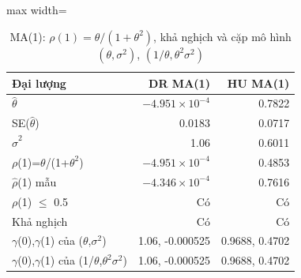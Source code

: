 \begin{table}[H]
\centering\small
\caption{MA(1): $\rho(1)=\theta/(1+\theta^2)$, khả nghịch và cặp mô hình $(\theta,\sigma^2)$, $(1/\theta,\theta^2\sigma^2)$}\label{tab:tab_b11_09_ma1}
\begin{adjustbox}{max width=\linewidth}
\begin{tabular}{lrr}
\toprule
Đại lượng & DR  MA(1) & HU  MA(1) \\
\midrule
$\hat{\theta}$ & $-4.951\times10^{-4}$ & 0.7822 \\
SE($\hat{\theta}$) & 0.0183 & 0.0717 \\
$\hat{\sigma}^{2}$ & 1.06 & 0.6011 \\
$\rho$(1)=$\theta$/(1+$\theta^{2}$) & $-4.951\times10^{-4}$ & 0.4853 \\
$\hat{\rho}$(1) mẫu & $-4.346\times10^{-4}$ & 0.7616 \\
\textbar{}$\rho$(1)\textbar{} $\le$ 0.5 & Có & Có \\
Khả nghịch & Có & Có \\
$\gamma$(0),$\gamma$(1) của ($\theta$,$\sigma^{2}$) & 1.06, -0.000525 & 0.9688, 0.4702 \\
$\gamma$(0),$\gamma$(1) của (1/$\theta$,$\theta^{2}\sigma^{2}$) & 1.06, -0.000525 & 0.9688, 0.4702 \\
\bottomrule
\end{tabular}
\end{adjustbox}
\end{table}
